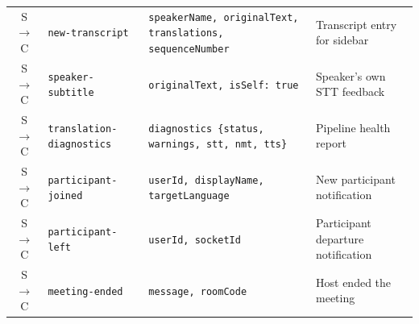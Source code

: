 \documentclass[conference]{IEEEtran}
\begin{document}
\begin{table}[htbp]
{\begin{tabular}{@{} c l l l @{}}
S $\to$ C & \texttt{new-transcript}       & \texttt{speakerName, originalText, translations, sequenceNumber} & Transcript entry for sidebar \\
S $\to$ C & \texttt{speaker-subtitle}     & \texttt{originalText, isSelf: true} & Speaker's own STT feedback \\
S $\to$ C & \texttt{translation-diagnostics} & \texttt{diagnostics \{status, warnings, stt, nmt, tts\}} & Pipeline health report \\
S $\to$ C & \texttt{participant-joined}   & \texttt{userId, displayName, targetLanguage} & New participant notification \\
S $\to$ C & \texttt{participant-left}     & \texttt{userId, socketId} & Participant departure notification \\
S $\to$ C & \texttt{meeting-ended}        & \texttt{message, roomCode} & Host ended the meeting \\
\bottomrule
\end{tabular}
}
\end{table}
\end{document}
